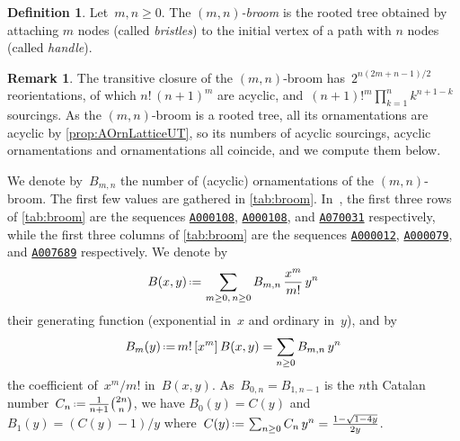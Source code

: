 \documentclass{amsart}
\theoremstyle{definition}
\newtheorem{definition}[theorem]{Definition}
\newtheorem{remark}[theorem]{Remark}
\newcommand{\eqdef}{\mbox{\,\raisebox{0.2ex}{\scriptsize\ensuremath{\mathrm:}}\ensuremath{=}\,}} %
\newcommand{\darkblue}{\color{darkblue}} %
\newcommand{\defn}[1]{\textsl{\darkblue #1}} %
\newcommand{\OEIS}[1]{{\rm \href{http://oeis.org/#1}{\texttt{#1}}}}
\begin{document}
\begin{definition}
Let~$m,n \ge 0$.
The \defn{$(m,n)$-broom} is the rooted tree obtained by attaching $m$ nodes (called \defn{bristles}) to the initial vertex of a path with $n$ nodes (called \defn{handle}).
\end{definition}

\begin{remark}
The transitive closure of the $(m,n)$-broom has~$2^{n(2m+n-1)/2}$ reorientations, of which $n! \, (n+1)^m$ are acyclic, and~$(n+1)!^m \prod_{k = 1}^n k^{n+1-k}$ sourcings.
As the $(m,n)$-broom is a rooted tree, all its ornamentations are acyclic by \cref{prop:AOrnLatticeUT}, so its numbers of acyclic sourcings, acyclic ornamentations and ornamentations all coincide, and we compute them below.
\end{remark}

We denote by~$B_{m,n}$ the number of (acyclic) ornamentations of the $(m,n)$-broom.
The first few values are gathered in \cref{tab:broom}.
In~\cite{OEIS}, the first three rows of \cref{tab:broom} are the sequences \OEIS{A000108}, \OEIS{A000108}, and \OEIS{A070031} respectively, while the first three columns of \cref{tab:broom} are the sequences \OEIS{A000012}, \OEIS{A000079}, and \OEIS{A007689} respectively.
We denote by
\[
B(x,y) \eqdef \sum_{m \ge 0, \, n \ge 0} B_{m,n} \, \frac{x^m}{m!} \, y^n
\]
their generating function (exponential in~$x$ and ordinary in~$y$), and by
\[
B_m(y) \eqdef m! \, [x^m] \, B(x,y) = \sum_{n \ge 0} B_{m,n} \, y^n
\]
the coefficient of~$x^m/m!$ in~$B(x,y)$.
As~$B_{0,n} = B_{1,n-1}$ is the $n$th Catalan number~$C_n \eqdef \frac{1}{n+1}\binom{2n}{n}$, we have $B_0(y) = C(y)$ and~$B_1(y) = (C(y) - 1)/y$ where~$C(y) \eqdef \sum_{n \ge 0} C_n \, y^n = \frac{1-\sqrt{1-4y}}{2y}$.
\end{document}
